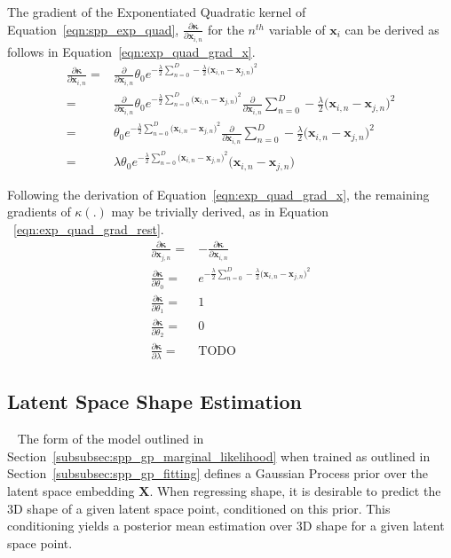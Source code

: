 The gradient of the Exponentiated Quadratic kernel of Equation~\ref{eqn:spp_exp_quad},
\( \frac{\partial \bm{\kappa}}{\partial \bm{x}_{i, n}} \) for the \( n^{th} \) variable 
of \( \bm{x}_{i} \) can be derived as follows in Equation~\ref{eqn:exp_quad_grad_x}.
\begin{align}
  \label{eqn:exp_quad_grad_x}
  \frac{\partial \bm{\kappa}}{\partial \bm{x}_{i, n}} ={}& 
  \frac{\partial}{\partial \bm{x}_{i, n}} \theta_{0} e^{-\frac{\lambda}{2} 
  \sum_{n = 0}^{D} -\frac{\lambda}{2} {\big( \bm{x}_{i, n} - \bm{x}_{j, n} \big)}^{2}}\\
  ={}& \frac{\partial}{\partial \bm{x}_{i, n}} \theta_{0} e^{-\frac{\lambda}{2} 
  \sum_{n = 0}^{D} {\big( \bm{x}_{i, n} - \bm{x}_{j, n} \big)}^{2}} 
  \frac{\partial}{\partial \bm{x}_{i, n}} \sum_{n = 0}^{D} -\frac{\lambda}{2} 
  {\big( \bm{x}_{i, n} - \bm{x}_{j, n} \big)}^{2}\\
  ={}& \theta_{0} e^{-\frac{\lambda}{2} 
  \sum_{n = 0}^{D} {\big( \bm{x}_{i, n} - \bm{x}_{j, n} \big)}^{2}} 
  \frac{\partial}{\partial \bm{x}_{i, n}} \sum_{n = 0}^{D} -\frac{\lambda}{2} 
  {\big( \bm{x}_{i, n} - \bm{x}_{j, n} \big)}^{2}\\
  ={}& \lambda \theta_{0} e^{-\frac{\lambda}{2} 
  \sum_{n = 0}^{D} {\big( \bm{x}_{i, n} - \bm{x}_{j, n} \big)}^{2}} 
  {\big( \bm{x}_{i, n} - \bm{x}_{j, n} \big)}
\end{align}

Following the derivation of Equation~\ref{eqn:exp_quad_grad_x}, the remaining 
gradients of \( \kappa(.) \) may be trivially derived, as in Equation
~\ref{eqn:exp_quad_grad_rest}.
\begin{align}
  \label{eqn:exp_quad_grad_rest}
  \frac{\partial \bm{\kappa}}{\partial \bm{x}_{j, n}} ={}& 
  -\frac{\partial \bm{\kappa}}{\partial \bm{x}_{i, n}}\\
  \frac{\partial \bm{\kappa}}{\partial \theta_{0}} ={}&
  e^{-\frac{\lambda}{2} 
  \sum_{n = 0}^{D} -\frac{\lambda}{2} {\big( \bm{x}_{i, n} - \bm{x}_{j, n} \big)}^{2}}\\
  \frac{\partial \bm{\kappa}}{\partial \theta_{1}} ={}& 1\\
  \frac{\partial \bm{\kappa}}{\partial \theta_{2}} ={}& 0\\
  \frac{\partial \bm{\kappa}}{\partial \lambda} ={}& \text{TODO}
\end{align}

\subsection{Latent Space Shape Estimation}
~\label{subsec:spp_latent_shape_est}
The form of the model outlined in Section~\ref{subsubsec:spp_gp_marginal_likelihood}
when trained as outlined in Section~\ref{subsubsec:spp_gp_fitting} defines a Gaussian 
Process prior over the latent space embedding \( \bm{X} \). When regressing shape, it 
is desirable to predict the 3D shape of a given latent space point, conditioned on this 
prior. This conditioning yields a posterior mean estimation over 3D shape for a given 
latent space point.

